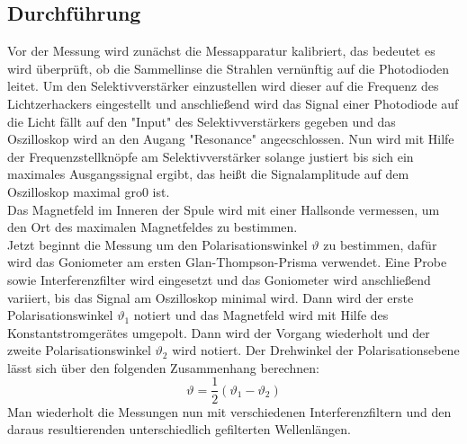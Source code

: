 \subsection{Durchführung}
\label{sec:durch}
Vor der Messung wird zunächst die Messapparatur kalibriert, das bedeutet es wird überprüft, ob die Sammellinse die Strahlen vernünftig auf die Photodioden leitet. Um den Selektivverstärker einzustellen wird dieser auf die Frequenz
des Lichtzerhackers eingestellt und anschließend wird das Signal einer Photodiode auf die Licht fällt auf den "Input" des Selektivverstärkers gegeben und das Oszilloskop wird an den Augang "Resonance" angecschlossen. Nun wird mit Hilfe der
Frequenzstellknöpfe am Selektivverstärker solange justiert bis sich ein maximales Ausgangssignal ergibt, das heißt die Signalamplitude auf dem Oszilloskop maximal gro0 ist. \\
Das Magnetfeld im Inneren der Spule wird mit einer Hallsonde vermessen, um den Ort des maximalen Magnetfeldes zu bestimmen. \\
Jetzt beginnt die Messung um den Polarisationswinkel $\vartheta$ zu bestimmen, dafür wird das Goniometer am ersten Glan-Thompson-Prisma verwendet. Eine Probe sowie Interferenzfilter wird eingesetzt und das Goniometer wird anschließend variiert, bis das Signal am Oszilloskop minimal wird. Dann wird der erste Polarisationswinkel $\vartheta_\mathrm{1}$ notiert und das Magnetfeld wird mit Hilfe des Konstantstromgerätes umgepolt. Dann wird der Vorgang wiederholt und der zweite
Polarisationswinkel $\vartheta_\mathrm{2}$ wird notiert. Der Drehwinkel der Polarisationsebene lässt sich über den folgenden Zusammenhang berechnen:
\begin{equation}
  \label{eqn:rotawinkel}
  \vartheta=\dfrac{1}{2}(\vartheta_\mathrm{1}-\vartheta_\mathrm{2})
\end{equation}
Man wiederholt die Messungen nun mit verschiedenen Interferenzfiltern und den daraus resultierenden unterschiedlich gefilterten Wellenlängen.
